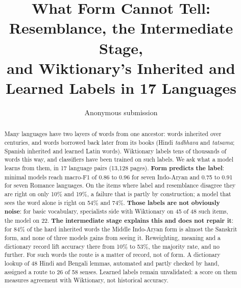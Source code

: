 \documentclass[11pt]{article}
\title{What Form Cannot Tell: Resemblance, the Intermediate Stage,\\and Wiktionary's Inherited and Learned Labels in 17 Languages}
\author{Anonymous submission}
\begin{document}
\maketitle

\begin{abstract}
Many languages have two layers of words from one ancestor: words inherited over centuries, and words borrowed back later from its books (Hindi \textit{tadbhava} and \textit{tatsama}; Spanish inherited and learned Latin words). Wiktionary labels tens of thousands of words this way, and classifiers have been trained on such labels. We ask what a model learns from them, in 17 language pairs (13,128 pages). \textbf{Form predicts the label}: minimal models reach macro-F1 of 0.86 to 0.96 for seven Indo-Aryan and 0.75 to 0.91 for seven Romance languages. On the items where label and resemblance disagree they are right on only 10\% and 19\%, a failure that is partly by construction; a model that sees the word alone is right on 54\% and 74\%. \textbf{Those labels are not obviously noise}: for basic vocabulary, specialists side with Wiktionary on 45 of 48 such items, the model on 22. \textbf{The intermediate stage explains this and does not repair it}: for 84\% of the hard inherited words the Middle Indo-Aryan form is almost the Sanskrit form, and none of three models gains from seeing it. Reweighting, meaning and a dictionary record lift accuracy there from 10\% to 53\%, the majority rate, and no further. For such words the route is a matter of record, not of form. A dictionary lookup of 48 Hindi and Bengali lemmas, automated and partly checked by hand, assigned a route to 26 of 58 senses. Learned labels remain unvalidated: a score on them measures agreement with Wiktionary, not historical accuracy.
\end{abstract}
\end{document}
